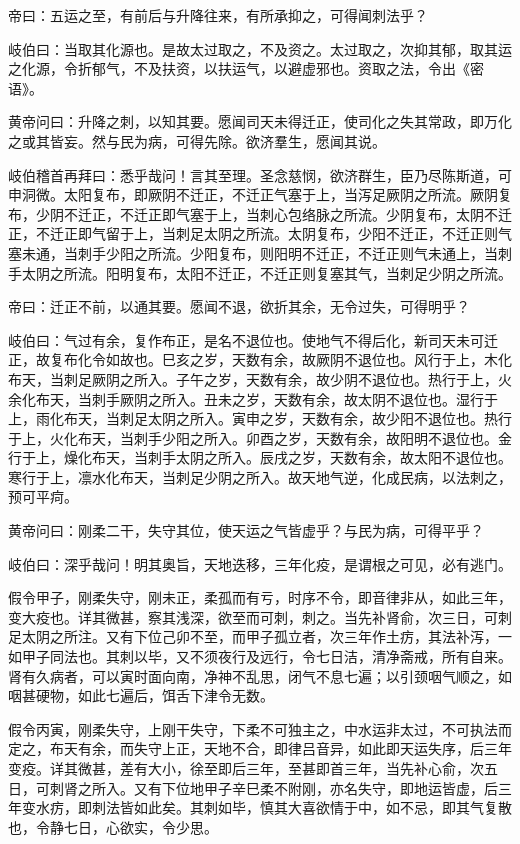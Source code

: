 \documentclass{article}%
\begin{document}
帝曰：五运之至，有前后与升降往来，有所承抑之，可得闻刺法乎？

岐伯曰：当取其化源也。是故太过取之，不及资之。太过取之，次抑其郁，取其运之化源，令折郁气，不及扶资，以扶运气，以避虚邪也。资取之法，令出《密语》。

黄帝问曰：升降之刺，以知其要。愿闻司天未得迁正，使司化之失其常政，即万化之或其皆妄。然与民为病，可得先除。欲济羣生，愿闻其说。

岐伯稽首再拜曰：悉乎哉问！言其至理。圣念慈悯，欲济群生，臣乃尽陈斯道，可申洞微。太阳复布，即厥阴不迁正，不迁正气塞于上，当泻足厥阴之所流。厥阴复布，少阴不迁正，不迁正即气塞于上，当刺心包络脉之所流。少阴复布，太阴不迁正，不迁正即气留于上，当刺足太阴之所流。太阴复布，少阳不迁正，不迁正则气塞未通，当刺手少阳之所流。少阳复布，则阳明不迁正，不迁正则气未通上，当刺手太阴之所流。阳明复布，太阳不迁正，不迁正则复塞其气，当刺足少阴之所流。

帝曰：迁正不前，以通其要。愿闻不退，欲折其余，无令过失，可得明乎？

岐伯曰：气过有余，复作布正，是名不退位也。使地气不得后化，新司天未可迁正，故复布化令如故也。巳亥之岁，天数有余，故厥阴不退位也。风行于上，木化布天，当刺足厥阴之所入。子午之岁，天数有余，故少阴不退位也。热行于上，火余化布天，当刺手厥阴之所入。丑未之岁，天数有余，故太阴不退位也。湿行于上，雨化布天，当刺足太阴之所入。寅申之岁，天数有余，故少阳不退位也。热行于上，火化布天，当刺手少阳之所入。卯酉之岁，天数有余，故阳明不退位也。金行于上，燥化布天，当刺手太阴之所入。辰戌之岁，天数有余，故太阳不退位也。寒行于上，凛水化布天，当刺足少阴之所入。故天地气逆，化成民病，以法刺之，预可平疴。

黄帝问曰：刚柔二干，失守其位，使天运之气皆虚乎？与民为病，可得平乎？

岐伯曰：深乎哉问！明其奥旨，天地迭移，三年化疫，是谓根之可见，必有逃门。

假令甲子，刚柔失守，刚未正，柔孤而有亏，时序不令，即音律非从，如此三年，变大疫也。详其微甚，察其浅深，欲至而可刺，刺之。当先补肾俞，次三日，可刺足太阴之所注。又有下位己卯不至，而甲子孤立者，次三年作土疠，其法补泻，一如甲子同法也。其刺以毕，又不须夜行及远行，令七日洁，清净斋戒，所有自来。肾有久病者，可以寅时面向南，净神不乱思，闭气不息七遍；以引颈咽气顺之，如咽甚硬物，如此七遍后，饵舌下津令无数。

假令丙寅，刚柔失守，上刚干失守，下柔不可独主之，中水运非太过，不可执法而定之，布天有余，而失守上正，天地不合，即律吕音异，如此即天运失序，后三年变疫。详其微甚，差有大小，徐至即后三年，至甚即首三年，当先补心俞，次五日，可刺肾之所入。又有下位地甲子辛巳柔不附刚，亦名失守，即地运皆虚，后三年变水疠，即刺法皆如此矣。其刺如毕，慎其大喜欲情于中，如不忌，即其气复散也，令静七日，心欲实，令少思。
\end{document}
